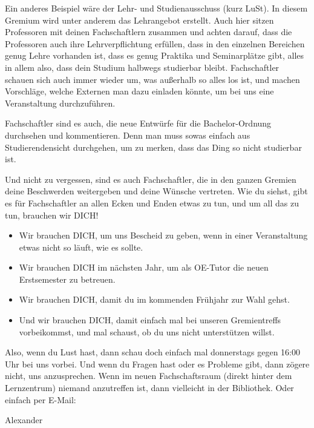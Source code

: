 Ein anderes Beispiel wäre der Lehr- und Studienausschuss (kurz LuSt). In diesem Gremium wird unter anderem das Lehrangebot erstellt. Auch hier sitzen Professoren mit deinen Fachschaftlern zusammen und achten darauf, dass die Professoren auch ihre Lehrverpflichtung erfüllen, dass in den einzelnen Bereichen genug Lehre vorhanden ist, dass es genug Praktika und Seminarplätze gibt, alles in allem also, dass dein Studium halbwegs studierbar bleibt. Fachschaftler schauen sich auch immer wieder um, was außerhalb so alles los ist, und machen Vorschläge, welche Externen man dazu einladen könnte, um bei uns eine Veranstaltung durchzuführen.


Fachschaftler sind es auch, die neue Entwürfe für die Bachelor-Ordnung durchsehen und kommentieren. Denn man muss sowas einfach aus Studierendensicht durchgehen, um zu merken, dass das Ding so nicht studierbar ist.



Und nicht zu vergessen, sind es auch Fachschaftler, die in den ganzen Gremien deine Beschwerden weitergeben und deine Wünsche vertreten. Wie du siehst, gibt es für Fachschaftler an allen Ecken und Enden etwas zu tun, und um all das zu tun, brauchen wir DICH!

\begin{itemize}

\item Wir brauchen DICH, um uns Bescheid zu geben, wenn in einer Veranstaltung etwas nicht so läuft, wie es sollte.

\item Wir brauchen DICH im nächsten Jahr, um als OE-Tutor die neuen Erstsemester zu betreuen.

\item Wir brauchen DICH, damit du im kommenden Frühjahr zur Wahl gehst.
\item Und wir brauchen DICH, damit einfach mal bei unseren Gremientreffs vorbeikommst, und mal schaust, ob du uns nicht unterstützen willst.
\end{itemize}

Also, wenn du Lust hast, dann schau doch einfach mal donnerstags gegen 16:00 Uhr bei uns vorbei. Und wenn du Fragen hast oder es Probleme gibt, dann zögere nicht, uns anzusprechen. Wenn im neuen Fachschaftsraum (direkt hinter dem Lernzentrum) niemand anzutreffen ist, dann vielleicht in der Bibliothek. Oder einfach per E-Mail: \emailfachschaft

\renewcommand{\labelitemi}{$\bullet$}

\begin{flushright} Alexander \end{flushright}


